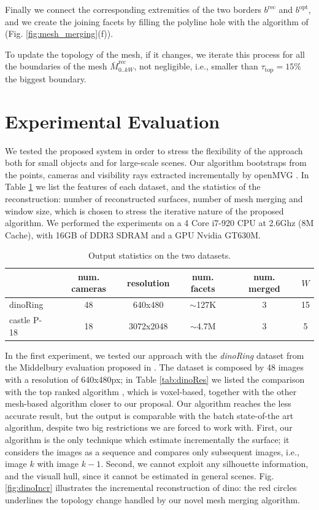 Finally we connect the corresponding extremities of the two borders $\mathit{b}^{\text{rec}}$ and $\mathit{b}^{\text{opt}}$, and we create the joining facets by filling the polyline hole with the algorithm of \cite{liepa2003filling}  (Fig. \ref{fig:mesh_merging}(f)).

To update the topology of the mesh, if it changes, we iterate this process for all the boundaries of the mesh  $\mathit{\bar{M}}_{0..kW}^{\text{rec}}$, not negligible, i.e., smaller than $\tau_{\text{top}}= 15\%$ the biggest boundary.



\section{Experimental Evaluation}
\label{sec:exp}
We tested the proposed system in order to stress the flexibility of the approach both for small objects and for large-scale scenes. 
Our algorithm bootstraps from the points, cameras and visibility rays extracted incrementally by openMVG \cite{openMVG}. In Table \ref{fig:expData} we list the features of each dataset, and the statistics of the reconstruction: number of reconstructed surfaces, number of mesh merging and window size, which is chosen to stress the iterative nature of the proposed algorithm.
We performed the experiments on a 4 Core i7-920 CPU at 2.6Ghz (8M Cache), with 16GB of DDR3 SDRAM and a GPU Nvidia GT630M.


\begin{table}[t]
\footnotesize
\centering
  \caption{Output statistics on the two datasets.}
  \label{fig:expData}
\begin{tabular}{lccccc}
&num. cameras& resolution&num. facets& num. merged &$W$ \\
\hline
dinoRing&48&640x480&$\sim$127K&3&15\\
castle P-18&18&3072x2048&$\sim$4.7M&3&5\\
\end{tabular}
\end{table}

In the first experiment, we tested our approach with the \emph{dinoRing} dataset  from the Middelbury evaluation proposed in \cite{seitz2006comparison}. 
The dataset is composed by 48 images with a resolution of 640x480px; in Table \ref{tab:dinoRes} we listed the comparison with the top ranked algorithm \cite{savinov2016semantic}, which is voxel-based, together with the other mesh-based algorithm closer to our proposal.
Our algorithm reaches the less accurate result, but  the output is comparable with the batch state-of-the art algorithm, despite two big restrictions we are forced to work with.
First, our algorithm is the only technique  which estimate incrementally the surface; it considers the images as a sequence and compares only subsequent images, i.e., image $k$ with image $k-1$.
Second, we cannot exploit any silhouette information, and the visuall hull, since it cannot be estimated in general scenes.
Fig. \ref{fig:dinoIncr} illustrates the incremental reconstruction of dino: the red circles underlines the topology change handled by our novel mesh merging algorithm.

